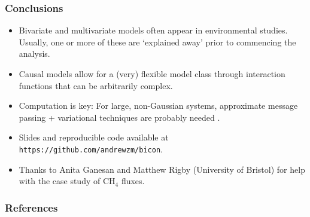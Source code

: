 \documentclass{beamer}
\begin{document}
\begin{frame}
\frametitle{Conclusions}

\begin{itemize}
\item Bivariate and multivariate models often appear in environmental studies. Usually, one or more of these are `explained away' prior to commencing the analysis.
\item Causal models allow for a (very) flexible model class through interaction functions that can be arbitrarily complex.
\item Computation is key: For large, non-Gaussian systems, approximate message passing + variational techniques are probably needed \citep{Cseke_2014}.
\item Slides and reproducible code available at \texttt{https://github.com/andrewzm/bicon}.
\item Thanks to Anita Ganesan and Matthew Rigby (University of Bristol) for help with the case study of CH$_4$ fluxes.
\end{itemize}
\end{frame}

\small

\begin{frame}[allowframebreaks]
\frametitle{References}




\end{frame}
\end{document}
